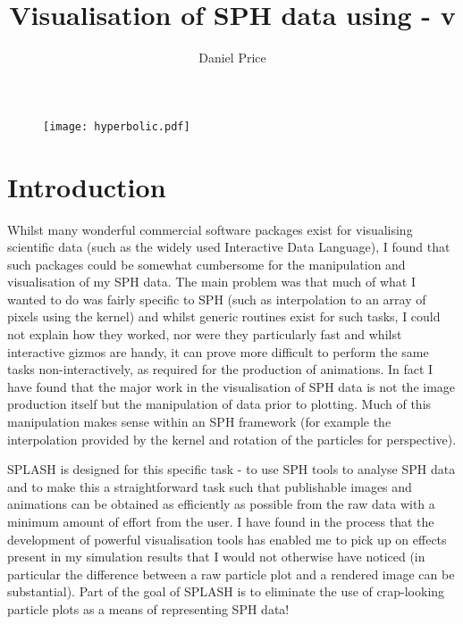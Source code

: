 \documentclass[a4paper,10pt]{article}
\title{Visualisation of SPH data using \splash - v}
\author{Daniel Price}
\newcommand{\splash}{\textsc{SPLASH }}
\begin{document}
\begin{figure}
\begin{center}
\texttt{[image: hyperbolic.pdf]}
\end{center}
\end{figure}
\maketitle
\tableofcontents
\newpage

\section{Introduction}
 Whilst many wonderful commercial software packages exist for visualising scientific
data (such as the widely used Interactive Data Language), I found that such packages
could be somewhat cumbersome for the manipulation and visualisation of my SPH data. The
main problem was that much of what I wanted to do was fairly specific to SPH (such as
interpolation to an array of pixels using the kernel) and whilst generic routines exist
for such tasks, I could not explain how they worked, nor were they
particularly fast and whilst interactive gizmos are handy, it can prove more difficult to perform the
same tasks non-interactively, as required for the production of animations. 
In fact I have found that the major work in the visualisation of SPH data is not the image production itself but the
manipulation of data prior to plotting. Much of this manipulation makes sense
within an SPH framework (for example the interpolation provided by the kernel
and rotation of the particles for perspective).

 \splash is designed for this specific task - to use SPH tools to analyse SPH data and to make this a
straightforward task such that publishable images and animations can be obtained
as efficiently as possible from the raw data with a minimum amount of effort
from the user. I have found in the process that the development of powerful
visualisation tools has enabled me to pick up on effects present in my
simulation results that I would not otherwise have noticed (in particular the
difference between a raw particle plot and a rendered image can be substantial). Part of the goal of
\splash is to eliminate the use of crap-looking particle plots as a means of representing SPH data!
\end{document}

